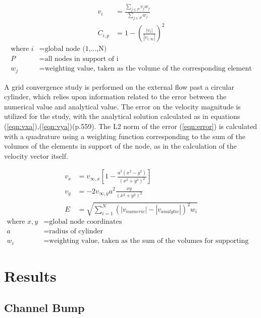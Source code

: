 \documentclass[conf]{new-aiaa}
\begin{document}
\begin{align}
	v_i &= \frac{\sum\limits_{j \in P}{v_j w_j}}{\sum\limits_{j \in P} w_j} \label{eqn:velvec}\\
	C_{i,p} &= 1 - \left(\frac{|v_i|}{|v_{i,\infty}|}\right)^2 \label{eqn:cp}
\end{align}
\begin{align*}
	\text{where\ \ \ \ }
	i &= \text{global node (1,...,N)} \\
	P &= \text{all nodes in support of i}\\
	w_j &= \text{weighting value, taken as the volume of the corresponding element}
\end{align*}

A grid convergence study is performed on the external flow past a circular cylinder, which relies upon information related to the error between the numerical value and analytical value.  The error on the velocity magnitude is utilized for the study, with the analytical solution calculated as in equations (\ref{eqn:vxa}),(\ref{eqn:vya})\cite{hirsch}(p.559).  The L2 norm of the error (\ref{eqn:error}) is calculated with a quadrature using a weighting function corresponding to the sum of the volumes of the elements in support of the node, as in the calculation of the velocity vector itself.

\begin{align}
	v_x &= v_{\infty,x} \left[ 1 - \frac{a^2(x^2-y^2)}{(x^2+y^2)^2} \right] \label{eqn:vxa}\\
	v_y &= -2 v_{\infty,y} a^2 \frac{xy}{(x^2+y^2)^2} \label{eqn:vya}\\
	E &= \sqrt{\sum_{i=1}^N (|v_{numeric}| - |v_{analytic}|)^2 w_i} \label{eqn:error}
\end{align}
\begin{align*}
	\text{where\ \ \ \ }
	x,y &= \text{global node coordinates} \\
	a &= \text{radius of cylinder} \\
	w_i &= \text{weighting value, taken as the sum of the volumes for supporting elements to i}
\end{align*}

\newpage
\section{Results}
\bigskip

\subsection{Channel Bump}
\bigskip
\end{document}
